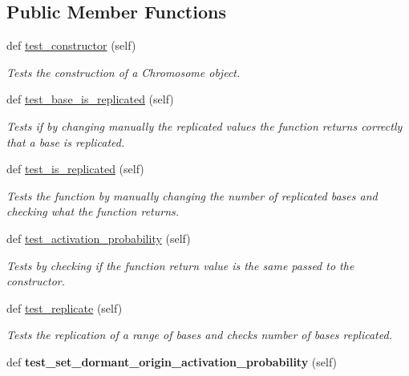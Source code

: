 \subsection*{Public Member Functions}
\begin{DoxyCompactItemize}
\item 
def \mbox{\hyperlink{classReDyMo_1_1test_1_1test__chromosome_1_1TestChromosome_a1399201440b0c37de8d1b6fce870f57b}{test\+\_\+constructor}} (self)
\begin{DoxyCompactList}\small\item\em Tests the construction of a Chromosome object. \end{DoxyCompactList}\item 
def \mbox{\hyperlink{classReDyMo_1_1test_1_1test__chromosome_1_1TestChromosome_af729347cc1469bd0043cdba714f4f04c}{test\+\_\+base\+\_\+is\+\_\+replicated}} (self)
\begin{DoxyCompactList}\small\item\em Tests if by changing manually the replicated values the function returns correctly that a base is replicated. \end{DoxyCompactList}\item 
def \mbox{\hyperlink{classReDyMo_1_1test_1_1test__chromosome_1_1TestChromosome_a4a34ea90fad85adb3f9bbb1dbc4753dc}{test\+\_\+is\+\_\+replicated}} (self)
\begin{DoxyCompactList}\small\item\em Tests the function by manually changing the number of replicated bases and checking what the function returns. \end{DoxyCompactList}\item 
def \mbox{\hyperlink{classReDyMo_1_1test_1_1test__chromosome_1_1TestChromosome_a016230d72ebca018818839d90460608c}{test\+\_\+activation\+\_\+probability}} (self)
\begin{DoxyCompactList}\small\item\em Tests by checking if the function return value is the same passed to the constructor. \end{DoxyCompactList}\item 
def \mbox{\hyperlink{classReDyMo_1_1test_1_1test__chromosome_1_1TestChromosome_a22ef06b4ce026761f08ffb7bfca2809a}{test\+\_\+replicate}} (self)
\begin{DoxyCompactList}\small\item\em Tests the replication of a range of bases and checks number of bases replicated. \end{DoxyCompactList}\item 
\mbox{\label{classReDyMo_1_1test_1_1test__chromosome_1_1TestChromosome_a7e91e79150e4610a3f019333b8bf322a}} 
def {\bfseries test\+\_\+set\+\_\+dormant\+\_\+origin\+\_\+activation\+\_\+probability} (self)
\end{DoxyCompactItemize}


